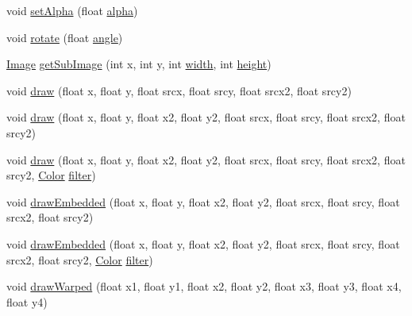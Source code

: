 \begin{DoxyCompactItemize}
\item 
void \mbox{\hyperlink{classorg_1_1newdawn_1_1slick_1_1_image_ad89670cd9f6ee4cdf1d084383252be45}{set\+Alpha}} (float \mbox{\hyperlink{classorg_1_1newdawn_1_1slick_1_1_image_a10f6c66f0f6ed78b3c1c05ac4f076dda}{alpha}})
\item 
void \mbox{\hyperlink{classorg_1_1newdawn_1_1slick_1_1_image_ad05979099b2373502fab3228f280e4d1}{rotate}} (float \mbox{\hyperlink{classorg_1_1newdawn_1_1slick_1_1_image_a4076b08a44e95eba2b65075342f16070}{angle}})
\item 
\mbox{\hyperlink{classorg_1_1newdawn_1_1slick_1_1_image}{Image}} \mbox{\hyperlink{classorg_1_1newdawn_1_1slick_1_1_image_a2ccb3bbdda674f9efdec614a54e31e32}{get\+Sub\+Image}} (int x, int y, int \mbox{\hyperlink{classorg_1_1newdawn_1_1slick_1_1_image_a7d02c85e21b388428cfe5cc5c82714a1}{width}}, int \mbox{\hyperlink{classorg_1_1newdawn_1_1slick_1_1_image_a54397a37823bc59ddc79ec70dc5cf226}{height}})
\item 
void \mbox{\hyperlink{classorg_1_1newdawn_1_1slick_1_1_image_a393c77eb139672d549dd0c96360b9d45}{draw}} (float x, float y, float srcx, float srcy, float srcx2, float srcy2)
\item 
void \mbox{\hyperlink{classorg_1_1newdawn_1_1slick_1_1_image_aa2932e4776eaa946aa604d8eb74a87d3}{draw}} (float x, float y, float x2, float y2, float srcx, float srcy, float srcx2, float srcy2)
\item 
void \mbox{\hyperlink{classorg_1_1newdawn_1_1slick_1_1_image_a01d87cba6ee9e70f7478ffc18b7c637d}{draw}} (float x, float y, float x2, float y2, float srcx, float srcy, float srcx2, float srcy2, \mbox{\hyperlink{classorg_1_1newdawn_1_1slick_1_1_color}{Color}} \mbox{\hyperlink{classorg_1_1newdawn_1_1slick_1_1_image_a1c6f09687817420f3762f32bb1c3ed76}{filter}})
\item 
void \mbox{\hyperlink{classorg_1_1newdawn_1_1slick_1_1_image_a7a401738f513cacb04ae9ef28c9ef856}{draw\+Embedded}} (float x, float y, float x2, float y2, float srcx, float srcy, float srcx2, float srcy2)
\item 
void \mbox{\hyperlink{classorg_1_1newdawn_1_1slick_1_1_image_a1a8e8cb732244e8ffb8b01c82dab330c}{draw\+Embedded}} (float x, float y, float x2, float y2, float srcx, float srcy, float srcx2, float srcy2, \mbox{\hyperlink{classorg_1_1newdawn_1_1slick_1_1_color}{Color}} \mbox{\hyperlink{classorg_1_1newdawn_1_1slick_1_1_image_a1c6f09687817420f3762f32bb1c3ed76}{filter}})
\item 
void \mbox{\hyperlink{classorg_1_1newdawn_1_1slick_1_1_image_a1f716a14c4d4c0d9b3265a80c8e102d1}{draw\+Warped}} (float x1, float y1, float x2, float y2, float x3, float y3, float x4, float y4)

\end{DoxyCompactItemize}
